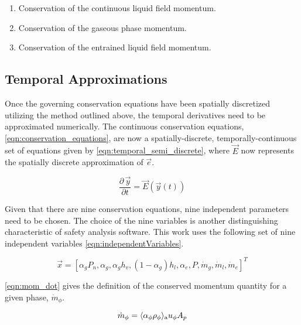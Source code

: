 \begin{enumerate}
\item{Conservation of the continuous liquid field momentum.}
\item{Conservation of the gaseous phase momentum.}
\item{Conservation of the entrained liquid field momentum.}
\end{enumerate}

\subsection{Temporal Approximations}
\label{subsect:temporal_approx}

Once the governing conservation equations have been spatially discretized utilizing the method outlined above, the temporal derivatives need to be approximated numerically.
The continuous conservation equations, \eqref{eqn:conservation_equations}, are now a spatially-discrete, temporally-continuous set of equations given by \eqref{eqn:temporal_semi_discrete}, where $\vec{E}$ now represents the spatially discrete approximation of $\vec{e}$.

\begin{equation}
\label{eqn:temporal_semi_discrete}
\frac{\partial \,\vec{y} }{\partial t} = \vec{E}(\vec{y}(t))
\end{equation}

Given that there are nine conservation equations, nine independent parameters need to be chosen.
The choice of the nine variables is another distinguishing characteristic of safety analysis software.
This work uses the following set of nine independent variables \eqref{eqn:independentVariables}.

\begin{equation}
\label{eqn:independentVariables}
\vec{x} = [\alpha_{g}P_{n}, \alpha_g, \alpha_g h_v, (1 - \alpha_g) h_l, \alpha_e, P, \dot{m}_g, \dot{m}_l, \dot{m}_e]^{T}
\end{equation}

\eqref{eqn:mom_dot} gives the definition of the conserved momentum quantity for a given phase, $\dot{m}_{\phi}$.

\begin{equation}
\label{eqn:mom_dot}
\dot{m}_{\phi} = \ave{\alpha_{\phi} \rho_{\phi}}_{\text{a}} u_{\phi} A_{p}
\end{equation}

